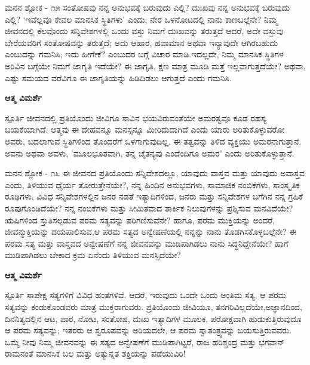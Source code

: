 \newpage
\begin{mananam}{\mananamfont \large ಮನನ ಶ್ಲೋಕ - ೧೫}
\footnotesize \mananamtext ಸಂತೋಷವು ನನ್ನ ಅನುಭವಕ್ಕೆ ಬರುವುದು ಎಲ್ಲಿ?  ದುಃಖವು ನನ್ನ ಅನುಭವಕ್ಕೆ ಬರುವುದು ಎಲ್ಲಿ? ‘ಇವೆಲ್ಲವೂ ಕೇವಲ ಮಾನಸಿಕ ಸ್ಥಿತಿಗಳು’ ಎಂದು, ನೇರ ಒಳನೋಟದಲ್ಲಿ ನಾನು ಕಾಣಬಲ್ಲೆನೇ? ನಿಮ್ಮ ಜೀವನದಲ್ಲಿ ಕೆಲವೊಂದು ಸನ್ನಿವೇಶಗಳಲ್ಲಿ ಒಂದು ವಸ್ತು ನಿಮಗೆ ದುಃಖವನ್ನು ತರುತ್ತದೆ ಆದರೆ, ಅದೇ ವಸ್ತುವು ಬೇರೆಯವರಿಗೆ ಸಂತೋಷವನ್ನು ತರುತ್ತದೆ; ಅದು ಆಹಾರ, ಹವಾಮಾನ ಅಥವಾ ಇನ್ಯಾವುದೇ ಆಗಿರಬಹುದು ಎಂಬುದನ್ನು ಗಮನಿಸಿ; ಇದು ಹೀಗೇಕೆ? ಎಂಬುದರ ಬಗ್ಗೆ ವಿಚಾರ ಮಾಡಿ.ಇದಲ್ಲದೇ, ನಿಮ್ಮ ಮಾನಸಿಕ ಸ್ಥಿತಿಗಳ ಅರಿವಿನ ಬಗ್ಗೆಯೇ ನಿಮಗೆ ಜಾಗೃತಿ ಇದೆಯೇ?  ಈ ಜಾಗೃತಿ, ಕ್ಷಣ ಮಾತ್ರ ಮೂಡಿ ಮತ್ತೆ ಇಲ್ಲವಾಗುತ್ತದೆಯೇ? ಅಥವಾ, ಎಷ್ಟು ಸಮಯದ ವರೆವಿಗೂ ಈ ಜಾಗೃತಿಯನ್ನು ಹಿಡಿದಿಡಲು ಆಗುತ್ತದೆ ಎಂದು ಗಮನಿಸಿ.
\end{mananam}
\WritingHand\enspace\textbf{ಆತ್ಮ ವಿಮರ್ಶೆ}
\begin{inspiration}{\mananamfont \large ಸ್ಪೂರ್ತಿ}
\footnotesize \mananamtext ಜೀವನದಲ್ಲಿ ಪ್ರತಿಯೊಂದು ಜೀವಿಗೂ ಸಾವಿನ ಭಯವಿರುವಂತೆಯೇ ಅಮರತ್ವವೂ ಕೂಡ ರಹಸ್ಯ ಬಯಕೆಯಾಗಿದೆ. ಆತ್ಮವು ಈ ದೇಹವನ್ನೂ ಮನಸ್ಸನ್ನೂ ಮೀರಿದುದಾಗಿದೆ ಎಂದು ಯಾರು ಅರಿತುಕೊಳ್ಳುವರೋ ಅವರು, ಬದಲಾಗುವ ಸ್ಥಿತಿಗಳಿಂದ ತೊಂದರೆಗೆ ಒಳಗಾಗುವುದಿಲ್ಲ. ಈ ತತ್ವವನ್ನು ತಿಳಿದ ವ್ಯಕ್ತಿಯು ಅಮರನಾಗುತ್ತಾನೆ. ಅವನು ಅಥವಾ ಅವಳು, 'ಮೂಲಭೂತವಾಗಿ, ತನ್ನ ಚೈತನ್ಯವು ಎಂದೆಂದಿಗೂ ಅಮರ' ಎಂದು ಅರಿತುಕೊಳ್ಳುತ್ತಾನೆ.
\end{inspiration}
\newpage



\newpage
\begin{mananam}{\mananamfont \large ಮನನ ಶ್ಲೋಕ - ೧೬}
\footnotesize \mananamtext ಈ ಜೀವನದ ಪ್ರತಿಯೊಂದು ಸನ್ನಿವೇಶದಲ್ಲೂ, ಯಾವುದು ವಾಸ್ತವ ಮತ್ತು ಯಾವುದು ಅವಾಸ್ತವ ಎಂದು, ತಿಳಿಯುವ ಧೈರ್ಯ ತೋರುತ್ತೇನೆಯೇ?, ನನ್ನ ಹಿಂದಿನ ಅನುಭವಗಳು, ಸಾಮಾಜಿಕ ನಂಬಿಕೆಗಳು, ಸಾಂಸ್ಕೃತಿಕ ರೂಢಿಗಳು, ವಿವಿಧ ಸನ್ನಿವೇಶಗಳಲ್ಲಿನ ಜನರ ನಡತೆ ಇತ್ಯಾದಿಗಳಿಂದ, ಜನರು ಮತ್ತು ಸನ್ನಿವೇಶಗಳ ಬಗೆಗಿನ ನನ್ನ ಗ್ರಹಿಕೆ ರೂಪುಗೊಂಡಿದೆಯೇ? ನನ್ನ ನಂಬಿಕೆಗಳು ಮತ್ತು ಸೀಮಿತವಾದ ತಾರ್ಕಿಕ ನಿಲುವುಗಳನ್ನು ಪ್ರಶ್ನಿಸುವ ಮನವಿದೆಯೇ? ಋಷಿಗಳಿಂದ ಸ್ತುತಿಸಲ್ಪಡುವ ಪರಮ ಸತ್ಯವನ್ನು ಪರಿಗಣಿಸುವೆನೇ? ಹಾಗೂ, ಪರಮ ಮುಕ್ತಿಯನ್ನು ಅಂದರೆ, ಜೀವನ್ಮುಕ್ತಿಯನ್ನು ದಯಪಾಲಿಸುವ,ಆ ಪರಮ ಸತ್ಯದ ಅನ್ವೇಷಣೆಯಲ್ಲಿ ನನ್ನನ್ನು ನಾನು ತೊಡಗಿಸಕೊಳ್ಳಬಲ್ಲೆನೇ? ಈ ಪರಮ ಸತ್ಯ ಮತ್ತು ವಾಸ್ತವದ ಅನ್ವೇಷಣೆಗೆ ನನ್ನ ಜೀವನವನ್ನು ಮುಡಿಪಾಗಿಡಲು ನಾನು ಸಿದ್ಧನಿದ್ದೇನೆಯೇ? ಹಾಗೆ ಮುಡಿಪಾಗಿಡಲು ಬೇಕಾದ ಕ್ರಮ ಏನೆಂದು ತಿಳಿಯುವ ಮನಸ್ಸಿದೆಯೇ?
\end{mananam}
\WritingHand\enspace\textbf{ಆತ್ಮ ವಿಮರ್ಶೆ}
\begin{inspiration}{\mananamfont \large ಸ್ಪೂರ್ತಿ}
\footnotesize \mananamtext ಸಾಪೇಕ್ಷ ಸತ್ಯಗಳಿಗೆ ವಿವಿಧ ಹಂತಗಳಿವೆ. ಆದರೆ, ಇರುವುದು ಒಂದೇ ಒಂದು ಅಂತಿಮ ಸತ್ಯ. ಆ ಪರಮ ಸತ್ಯವನ್ನು ಕಂಡುಕೊಂಡವರು ಮಾತ್ರ ಮುಕ್ತರಾಗುವರು. ಪ್ರತಿಯೊಂದು ಜೀವಿಯೂ, ತನಗರಿವಿಲ್ಲದೆಯೇ,ಅಜ್ಞಾನದಿಂದ, ದಿನನಿತ್ಯದಲ್ಲಿನ ಆಟ, ಪಾಠ, ನೋಟ, ಸಂತೋಷ, ದುಃಖ ಇತ್ಯಾದಿಗಳ ಮೂಲಕ, ಪರೋಕ್ಷವಾಗಿ ಹುಡುಕುತ್ತಿರುವುದೂ ಆ ಪರಮ ಸತ್ಯವನ್ನು; ಇತರರು ಆ ಸ್ವರೂಪವನ್ನು ಅರಿಯದಲೇ, ಆ ಪರಮ ಸ್ವಾತಂತ್ರ್ಯವನ್ನು ಬಯಸುತ್ತಿರುವವರು. ಒಮ್ಮೆ ನೀವು ನಿಮ್ಮ ಜೀವನವನ್ನು ಈ ಸತ್ಯದ ಅನ್ವೇಷಣೆಗೆ ಮುಡಿಪಾಗಿಟ್ಟರೆ, ರಾಜ ಹರಿಶ್ಚಂದ್ರ ಮತ್ತು ಭಗವಾನ್ ರಾಮನಂತೆ ಮಾನಸಿಕ ಬಲ ಮತ್ತು ಅತ್ಯುನ್ನತ ಶಕ್ತಿಯನ್ನು ಪಡೆಯುವಿರಿ!
\end{inspiration}
\newpage

